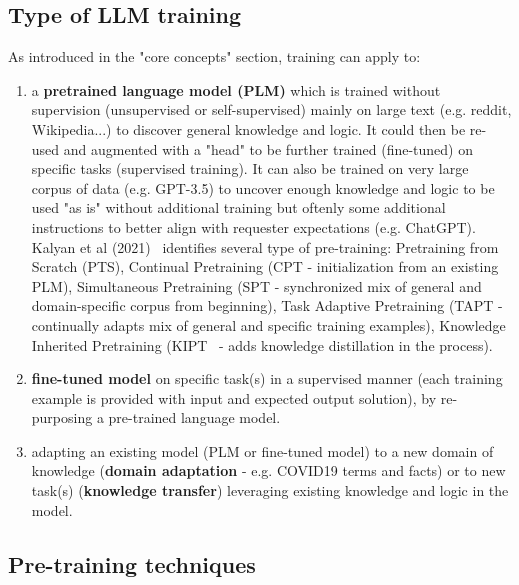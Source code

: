 \documentclass[acmsmall]{acmart}
\begin{document}
\subsection{Type of LLM training}
As introduced in the "core concepts" section, training can apply to:
\begin{enumerate}
    \item a \textbf{pretrained language model (PLM)} which is trained without supervision (unsupervised or self-supervised) mainly on large text (e.g. reddit, Wikipedia...) to discover general knowledge and logic. It could then be re-used and augmented with a "head" to be further trained (fine-tuned) on specific tasks (supervised training). It can also be trained on very large corpus of data (e.g. GPT-3.5) to uncover enough knowledge and logic to be used "as is" without additional training but oftenly some additional instructions to better align with requester expectations (e.g. ChatGPT). Kalyan et al (2021)~\citep{kalyanAMMUSSurveyTransformerbased2021} identifies several type of pre-training: Pretraining from Scratch (PTS), Continual Pretraining (CPT - initialization from an existing PLM), Simultaneous Pretraining (SPT - synchronized mix of general and domain-specific corpus from beginning), Task Adaptive Pretraining (TAPT - continually adapts mix of general and specific training examples), Knowledge Inherited Pretraining (KIPT~\citep{qinKnowledgeInheritancePretrained2022} - adds knowledge distillation in the process).
    \item \textbf{fine-tuned model} on specific task(s) in a supervised manner (each training example is provided with input and expected output solution), by re-purposing a pre-trained language model.
    \item adapting an existing model (PLM or fine-tuned model) to a new domain of knowledge (\textbf{domain adaptation} - e.g. COVID19 terms and facts) or to new task(s) (\textbf{knowledge transfer}) leveraging existing knowledge and logic in the model.
\end{enumerate}

\subsection{Pre-training techniques}\label{sec_pretraining}
\end{document}
